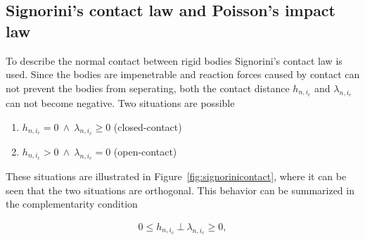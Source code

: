 \documentclass[../DC2017114Bouma.tex]{subfiles}
\begin{document}
\subsection{Signorini's contact law and Poisson's impact law}
To describe the normal contact between rigid bodies Signorini's contact law is used. Since the bodies are impenetrable and reaction forces caused by contact can not prevent the bodies from seperating, both the contact distance $h_{n,i_c}$ and $\lambda_{n,i_c}$ can not become negative. Two situations are possible

\begin{enumerate}
\item $h_{n,i_c}=0\ \wedge\ \lambda_{n,i_c} \geq 0$ (closed-contact)
\item $h_{n,i_c}>0\ \wedge\ \lambda_{n,i_c} = 0$ (open-contact)
\end{enumerate}

These situations are illustrated in Figure~\ref{fig:signorinicontact}, where it can be seen that the two situations are orthogonal. This behavior can be summarized in the complementarity condition

\begin{align}
0\leq h_{n,i_c}\ \bot\ \lambda_{n,i_c} \geq 0,\label{eq:signorini}
\end{align}
\end{document}
